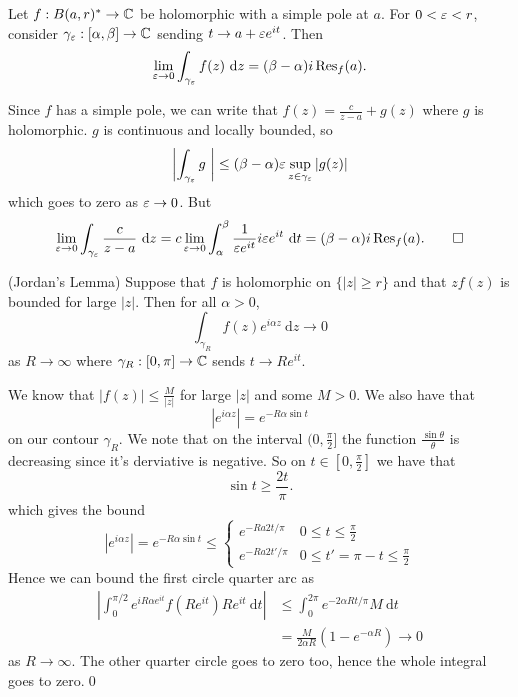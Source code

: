 \documentclass{article}
\begin{document}
\begin{lemma}
	Let $ f:B(a,r)^* \to \mathbb{C} $ be holomorphic with a simple pole at $ a $. For $ 0 < \varepsilon <r $, consider $ \gamma_\varepsilon:[\alpha,\beta] \to \mathbb{C} $ sending $ t\to a+\varepsilon e^{it} $. Then
	\[
		\lim_{\ep \to 0} \int_{\gamma_\ep} f(z) \ \mathrm dz = (\beta-\alpha)i \Res_f(a).
	\]
\end{lemma}
\pf Since $ f $ has a simple pole, we can write that $ f(z) = \frac {c}{z-a} + g(z) $ where $ g $ is holomorphic. $ g $ is continuous and locally bounded, so
\[
	\left|\int_{\gamma_\varepsilon} g \ \right| \le (\beta-\alpha)\varepsilon\sup_{z\in{\gamma_\varepsilon}}|g(z)|
\]
which goes to zero as $ \varepsilon\to0 $. But
\[
	\lim_{\ep \to 0} \int_{\gamma_\ep}\frac{c}{z-a}\ \mathrm dz = c \lim_{\ep \to 0} \int_\alpha^\beta \frac1{\ep e^{it}} i \ep e^{it} \ \mathrm dt = (\beta-\alpha)i\Res_f(a).\qed
\]
\begin{lemma}
	(Jordan's Lemma) Suppose that $ f $ is holomorphic on $ \{|z| \ge r\} $ and that $ zf(z) $ is bounded for large $ |z| $. Then for all $ \alpha>0 $,
	\[
		\int_{\gamma_R} f(z)e^{i\alpha z} \ \mathrm dz \to 0
	\]
	as $ R\to\infty $ where $ \gamma_R:[0,\pi]\to \mathbb{C} $ sends $ t\to Re^{it} $.
\end{lemma}
\pf We know that $ |f(z)| \le \frac{M}{|z|} $ for large $ |z| $ and some $ M>0 $. We also have that
\[
	|e^{i\alpha z}| = e^{-R\alpha\sin t}
\]
on our contour $ \gamma_R $. We note that on the interval $ (0,\frac \pi2] $ the function $ \frac{\sin\theta}\theta $ is decreasing since it's derviative is negative. So on $ t\in [0,\frac \pi 2] $ we have that
\[
	\sin t\ge \frac{2t}\pi.
\]
which gives the bound
\[
	|e^{i\alpha z}| = e^{-R\alpha\sin t} \le \begin{cases}
		e^{-Ra2t/\pi} & 0\le t \le \frac \pi 2 \\
		e^{-Ra2t'/\pi} & 0 \le t' = \pi - t \le \frac \pi2
	\end{cases}
\]
Hence we can bound the first circle quarter arc as
\begin{align*}
	\left|\int_0^{\pi/2} e^{iR\alpha e^{it}} f(Re^{it}) Re^{it}\ \mathrm dt\right| &\le \int_0^{2\pi} e^{-2\alpha Rt/\pi} M \ \mathrm dt \\
										      &= \frac{M}{2\alpha R} (1-e^{-\alpha R})\to 0
\end{align*}
as $ R\to\infty $. The other quarter circle goes to zero too, hence the whole integral goes to zero.\qed
\end{document}
